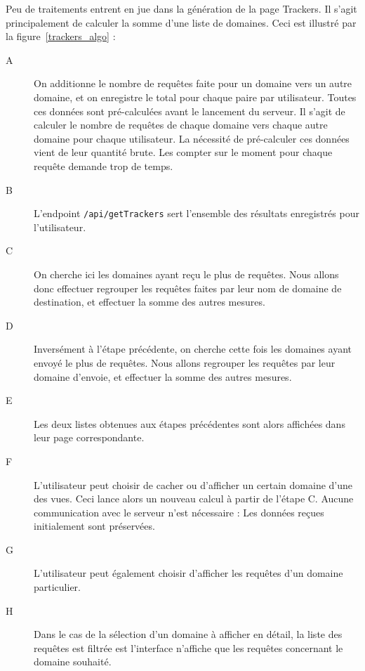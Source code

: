 		Peu de traitements entrent en jue dans la génération de la page Trackers. Il s'agit principalement de calculer la somme d'une liste de domaines. Ceci est illustré par la figure~\ref{trackers_algo} :
		\begin{description}
			\item[A] On additionne le nombre de requêtes faite pour un domaine vers un autre domaine, et on enregistre le total pour chaque paire par utilisateur. Toutes ces données sont pré-calculées avant le lancement du serveur. Il s'agit de calculer le nombre de requêtes de chaque domaine vers chaque autre domaine pour chaque utilisateur. La nécessité de pré-calculer ces données vient de leur quantité brute. Les compter sur le moment pour chaque requête demande trop de temps.

			\item[B] L'endpoint \texttt{/api/getTrackers} sert l'ensemble des résultats enregistrés pour l'utilisateur.

			\item[C] On cherche ici les domaines ayant reçu le plus de requêtes. Nous allons donc effectuer regrouper les requêtes faites par leur nom de domaine de destination, et effectuer la somme des autres mesures.

			\item[D] Inversément à l'étape précédente, on cherche cette fois les domaines ayant envoyé le plus de requêtes. Nous allons regrouper les requêtes par leur domaine d'envoie, et effectuer la somme des autres mesures.

			\item[E] Les deux listes obtenues aux étapes précédentes sont alors affichées dans leur page correspondante.

			\item[F] L'utilisateur peut choisir de cacher ou d'afficher un certain domaine d'une des vues. Ceci lance alors un nouveau calcul à partir de l'étape C. Aucune communication avec le serveur n'est nécessaire : Les données reçues initialement sont préservées.

			\item[G] L'utilisateur peut également choisir d'afficher les requêtes d'un domaine particulier.

			\item[H] Dans le cas de la sélection d'un domaine à afficher en détail, la liste des requêtes est filtrée est l'interface n'affiche que les requêtes concernant le domaine souhaité.
		\end{description}

